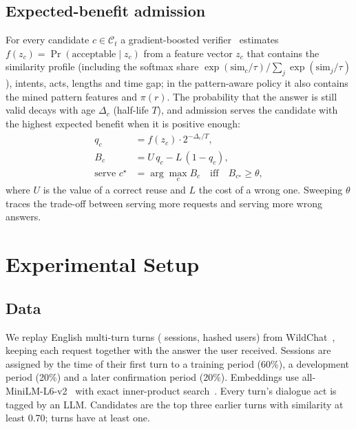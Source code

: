 \documentclass[conference]{IEEEtran}
\begin{document}
\subsection{Expected-benefit admission}
For every candidate $c\in\mathcal{C}_t$ a gradient-boosted verifier~\cite{ke2017lightgbm} estimates $f(z_c)=\Pr(\text{acceptable}\mid z_c)$ from a feature vector $z_c$ that contains the similarity profile (including the softmax share $\exp(\mathrm{sim}_c/\tau)/\sum_{j}\exp(\mathrm{sim}_j/\tau)$), intents, acts, lengths and time gap; in the pattern-aware policy it also contains the mined pattern features and $\pi(r)$. The probability that the answer is still valid decays with age $\Delta_c$ (half-life $T$), and admission serves the candidate with the highest expected benefit when it is positive enough:
\begin{align}
q_c &= f(z_c)\cdot 2^{-\Delta_c/T}, \\
B_c &= U\,q_c - L\,(1-q_c), \label{eq:benefit}\\
\text{serve } c^\star &= \arg\max_{c} B_c \quad \text{iff} \quad B_{c^\star}\ge\theta, \label{eq:decision}
\end{align}
where $U$ is the value of a correct reuse and $L$ the cost of a wrong one. Sweeping $\theta$ traces the trade-off between serving more requests and serving more wrong answers.

\section{Experimental Setup}
\label{sec:setup}
\subsection{Data}
We replay \nTurns{} English multi-turn turns (\nSessions{} sessions, \nUsers{} hashed users) from WildChat~\cite{zhao2024wildchat}, keeping each request together with the answer the user received. Sessions are assigned by the time of their first turn to a training period (60\%), a development period (20\%) and a later confirmation period (20\%). Embeddings use all-MiniLM-L6-v2~\cite{reimers2019sbert,wang2020minilm} with exact inner-product search~\cite{johnson2021faiss}. Every turn's dialogue act is tagged by an LLM. Candidates are the top three earlier turns with similarity at least 0.70; \nCandTurns{} turns have at least one.
\end{document}
